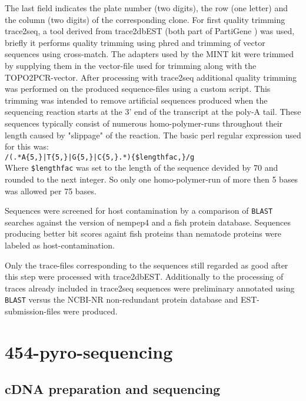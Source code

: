 The last field indicates the plate number (two digits), the row (one
letter) and the column (two digits) of the corresponding clone. For
first quality trimming trace2seq, a tool derived from trace2dbEST
(both part of PartiGene \cite{parkinson_partigene--constructing_2004})
was used, briefly it performs quality trimming using
phred\cite{ewing_base-calling_1998} and trimming of vector sequences
using cross-match\cite{PHRAP}. The adapters used by the MINT kit were
trimmed by supplying them in the vector-file used for trimming along
with the TOPO2PCR-vector. After processing with trace2seq additional
quality trimming was performed on the produced sequence-files using a
custom script. This trimming was intended to remove artificial
sequences produced when the sequencing reaction starts at the 3' end
of the transcript at the poly-A tail. These sequences typically
consist of numerous homo-polymer-runs throughout their length caused
by "slippage" of the reaction.
The basic perl regular expression used for this was:\\

\texttt{/(.*A\{5,\}|T\{5,\}|G\{5,\}|C\{5,\}.*)\{\$lengthfac,\}/g}\\

Where \texttt{\$lengthfac} was set to the length of the sequence
devided by 70 and rounded to the next integer. So only one
homo-polymer-run of more then 5 bases was allowed per 75 bases.

Sequences were screened for host contamination by a comparison of
\texttt{BLAST} searches against the version of nempep4 and a fish
protein database. Sequences producing better bit scores againt fish
proteins than nematode proteins were labeled as host-contamination.

Only the trace-files corresponding to the sequences still regarded as
good after this step were processed with trace2dbEST. Additionally to
the processing of traces already included in trace2seq sequences were
preliminary annotated using \texttt{BLAST} versus the NCBI-NR
non-redundant protein database and EST-submission-files were produced.

\section{454-pyro-sequencing}

\subsection*{cDNA preparation and sequencing}

